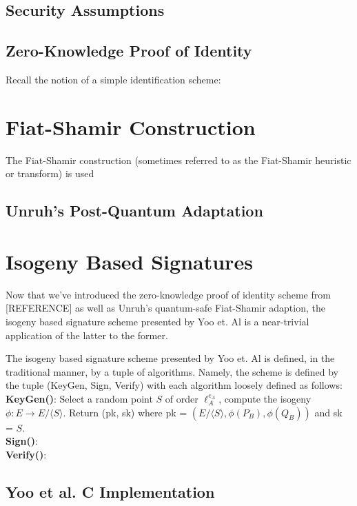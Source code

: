 \subsection{Security Assumptions}



\subsection{Zero-Knowledge Proof of Identity}

Recall the notion of a simple identification scheme:

\section{Fiat-Shamir Construction}

The Fiat-Shamir construction (sometimes referred to as the Fiat-Shamir heuristic or transform) is used

\subsection{Unruh's Post-Quantum Adaptation}



\section{Isogeny Based Signatures}

Now that we've introduced the zero-knowledge proof of identity scheme from [REFERENCE] as well as Unruh's quantum-safe Fiat-Shamir adaption, the isogeny based signature scheme presented by Yoo et. Al is a near-trivial application of the latter to the former. 

The isogeny based signature scheme presented by Yoo et. Al is defined, in the traditional manner, by a tuple of algorithms. Namely, the scheme is defined by the tuple (KeyGen, Sign, Verify) with each algorithm loosely defined as follows:\\
\textbf{KeyGen(}\textbf{)}: Select a random point $S$ of order $\ell_{A}^{e_A}$, compute the isogeny $\phi: E \rightarrow E/ \langle S \rangle$. Return (pk, sk) where pk = $(E/ \langle S \rangle, \phi(P_B), \phi(Q_B))$ and sk = $S$.\\
\textbf{Sign()}:\\
\textbf{Verify()}:\\

\subsection{Yoo et al. C Implementation}

